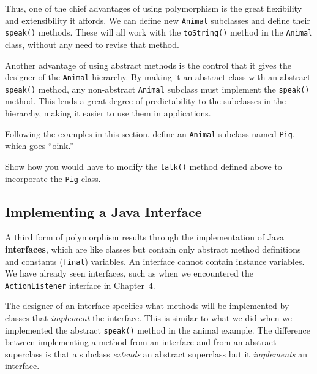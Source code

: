 Thus, one of the chief advantages of using polymorphism is the great
flexibility and extensibility it affords. We can define new {\tt Animal}
subclasses and define their {\tt speak()} methods. These will
all work with the {\tt toString()} method in the {\tt Animal} class,
without any need to revise that method.

Another advantage of using abstract methods is the control that it
gives the designer of the {\tt Animal} hierarchy.  By making it an
abstract class with an abstract {\tt speak()} method, any non-abstract
{\tt Animal} subclass must implement the {\tt speak()} method. This
lends a great degree of predictability to the subclasses in the
hierarchy, making it easier to use them in applications.

\label{self-study-exercises}
\begin{SSTUDY}

\item  Following the examples in this section, define an {\tt Animal} subclass
named {\tt Pig}, which goes ``oink.''

\item  Show how you would have to modify the {\tt talk()} method
defined above to incorporate the {\tt Pig} class. 

\end{SSTUDY}

\subsection{Implementing a Java Interface}

A third form of polymorphism results through the implementation of
Java {\bf interfaces}, which are like classes but contain only
abstract method definitions and constants ({\tt final}) variables.  An
interface cannot contain instance variables.  We have already seen
interfaces, such as when we encountered the {\tt ActionListener}
interface in Chapter~4.

The designer of an interface specifies what methods will be implemented
by classes that {\em implement} the interface. This is similar to what
we did when we implemented the abstract {\tt speak()} method in the
animal example. The difference between implementing a method from an
interface and from an abstract superclass is that a subclass {\em
extends} an abstract superclass but it {\em implements} an interface.

